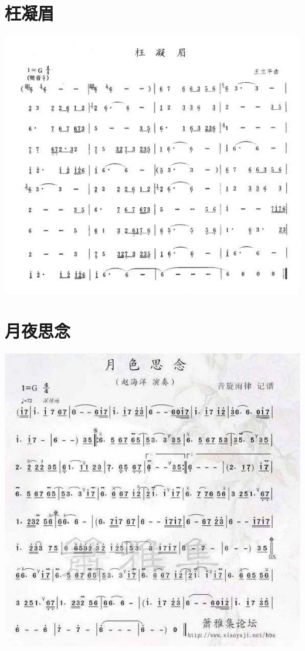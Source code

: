 \documentclass[cn,pad,chinese,chinesefont=nofont]{elegantbook}
\begin{document}
\section{枉凝眉}
    \includegraphics[width=\textwidth]{dongxiao/枉凝眉.jpg}
\section{月夜思念}
    \includegraphics[width=\textwidth]{dongxiao/月夜思念.jpg}
\end{document}
